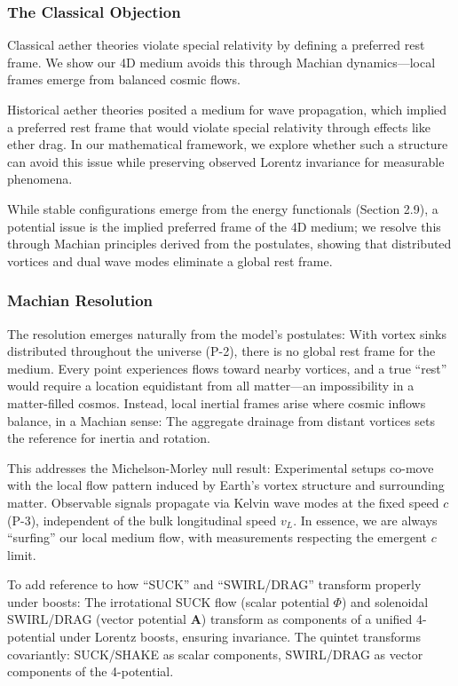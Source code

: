 \subsubsection{The Classical Objection}

Classical aether theories violate special relativity by defining a preferred rest frame. We show our 4D medium avoids this through Machian dynamics---local frames emerge from balanced cosmic flows.

Historical aether theories posited a medium for wave propagation, which implied a preferred rest frame that would violate special relativity through effects like ether drag. In our mathematical framework, we explore whether such a structure can avoid this issue while preserving observed Lorentz invariance for measurable phenomena.

While stable configurations emerge from the energy functionals (Section 2.9), a potential issue is the implied preferred frame of the 4D medium; we resolve this through Machian principles derived from the postulates, showing that distributed vortices and dual wave modes eliminate a global rest frame.

\subsubsection{Machian Resolution}

The resolution emerges naturally from the model's postulates: With vortex sinks distributed throughout the universe (P-2), there is no global rest frame for the medium. Every point experiences flows toward nearby vortices, and a true ``rest'' would require a location equidistant from all matter---an impossibility in a matter-filled cosmos. Instead, local inertial frames arise where cosmic inflows balance, in a Machian sense: The aggregate drainage from distant vortices sets the reference for inertia and rotation.

This addresses the Michelson-Morley null result: Experimental setups co-move with the local flow pattern induced by Earth's vortex structure and surrounding matter. Observable signals propagate via Kelvin wave modes at the fixed speed $c$ (P-3), independent of the bulk longitudinal speed $v_L$. In essence, we are always ``surfing'' our local medium flow, with measurements respecting the emergent $c$ limit.

To add reference to how ``SUCK'' and ``SWIRL/DRAG'' transform properly under boosts: The irrotational SUCK flow (scalar potential $\Phi$) and solenoidal SWIRL/DRAG (vector potential $\mathbf{A}$) transform as components of a unified 4-potential under Lorentz boosts, ensuring invariance. The quintet transforms covariantly: SUCK/SHAKE as scalar components, SWIRL/DRAG as vector components of the 4-potential.

